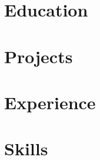 \documentclass[letter,12pt]{article}
\begin{document}
%

\section{Education}


\section{Projects}


\section{Experience}


\section{Skills}

\end{document}
